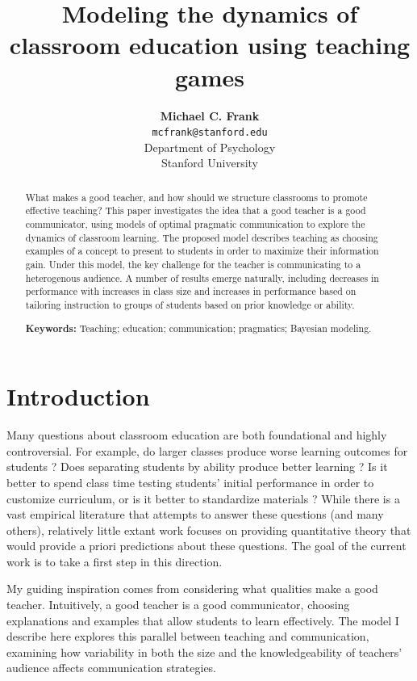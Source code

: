 \documentclass[10pt,letterpaper]{article}
\title{Modeling the dynamics of classroom education using teaching games}
\author{{\large \bf Michael C. Frank} \\
  \texttt{mcfrank@stanford.edu} \\
  Department of Psychology\\
  Stanford University}
\begin{document}
\maketitle

\begin{abstract}
What makes a good teacher, and how should we structure classrooms to promote effective teaching? This paper investigates the idea that a good teacher is a good communicator, using models of optimal pragmatic communication to explore the dynamics of classroom learning. The proposed model describes teaching as choosing examples of a concept to present to students in order to maximize their information gain. Under this model, the key challenge for the teacher is communicating to a heterogenous audience. A number of results emerge naturally, including decreases in performance with increases in class size and increases in performance based on tailoring instruction to groups of students based on prior knowledge or ability.

\textbf{Keywords:} 
Teaching; education; communication; pragmatics; Bayesian modeling.
\end{abstract}

\section{Introduction}

Many questions about classroom education are both foundational and highly controversial. For example, do larger classes produce worse learning outcomes for students \cite{glass1979,slavin1989}? Does separating students by ability produce better learning \cite{slavin1987,tomlinson1999}? Is it better to spend class time testing students' initial performance in order to customize curriculum, or is it better to standardize materials \cite{fuchs1986}? While there is a vast empirical literature that attempts to answer these questions (and many others), relatively little extant work focuses on providing quantitative theory that would provide a priori predictions about these questions. The goal of the current work is to take a first step in this direction.

My guiding inspiration comes from considering what qualities make a good teacher. Intuitively, a good teacher is a good communicator, choosing explanations and examples that allow students to learn effectively. The model I describe here explores this parallel between teaching and communication, examining how variability in both the size and the knowledgeability of teachers' audience affects communication strategies. 
\end{document}
